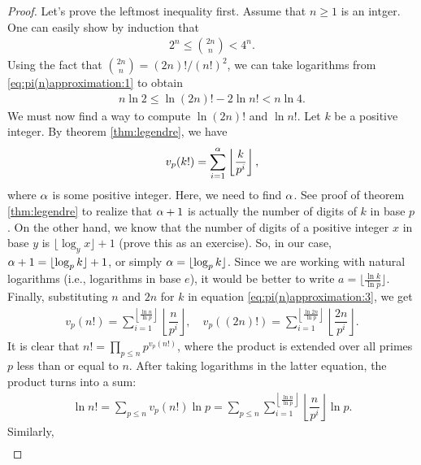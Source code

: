 	\begin{proof}
		Let's prove the leftmost inequality first. Assume that $n \geq 1$ is an intger. One can easily show by induction that
		\begin{align}
		\label{eq:pi(n)approximation:1}
		2^n \leq \binom{2n}{n} < 4^n.
		\end{align}
		Using the fact that $\binom{2n}{n} = (2n)!/(n!)^2$, we can take logarithms from \eqref{eq:pi(n)approximation:1} to obtain
		\begin{align}
		\label{eq:pi(n)approximation:2}
		n \ln 2 \leq \ln (2n)! - 2 \ln n! < n \ln 4.
		\end{align}
		We must now find a way to compute $\ln(2n)!$ and $\ln n!$. Let $k$ be a positive integer. By theorem \eqref{thm:legendre}, we have
		\begin{align}
		\label{eq:pi(n)approximation:3}
		v_p(k!) = \sum_{i=1}^{\alpha}\left\lfloor\dfrac{k}{p^i}\right\rfloor,
		\end{align} 
		where $\alpha$ is some positive integer. Here, we need to find $\alpha$. See proof of theorem \eqref{thm:legendre} to realize that $\alpha+1$ is actually the number of digits of $k$ in base $p$. On the other hand, we know that the number of digits of a positive integer $x$ in base $y$ is $\lfloor\log_y x\rfloor+1$ (prove this as an exercise). So, in our case, $\alpha+1=\lfloor\log_p k\rfloor+1$, or simply $\alpha = \lfloor\log_p k\rfloor$. Since we are working with natural logarithms (i.e., logarithms in base $e$), it would be better to write $a = \lfloor \frac{\ln k}{\ln p}\rfloor$. Finally, substituting $n$ and $2n$ for $k$ in equation \eqref{eq:pi(n)approximation:3}, we get
			\begin{align*}
				v_p(n!) = \sum_{i=1}^{\left\lfloor \frac{\ln n}{\ln p}\right\rfloor}\left\lfloor\dfrac{n}{p^i}\right\rfloor, \quad v_p\left((2n)!\right) = \sum_{i=1}^{\left\lfloor \frac{\ln 2n}{\ln p}\right\rfloor}\left\lfloor\dfrac{2n}{p^i}\right\rfloor.
			\end{align*}
		It is clear that $n! = \prod\limits_{p\leq n} p^{v_p(n!)}$, where the product is extended over all primes $p$ less than or equal to $n$. After taking logarithms in the latter equation, the product turns into a sum:
			\begin{align*}
			\ln n! = \sum_{p \leq n} v_p(n!) \ln p = \sum_{p \leq n}  \sum_{i=1}^{\left\lfloor \frac{\ln n}{\ln p}\right\rfloor}\left\lfloor\dfrac{n}{p^i}\right\rfloor \ln p.
			\end{align*}
		Similarly,
			\begin{align*}

\end{align*}
\end{proof}
